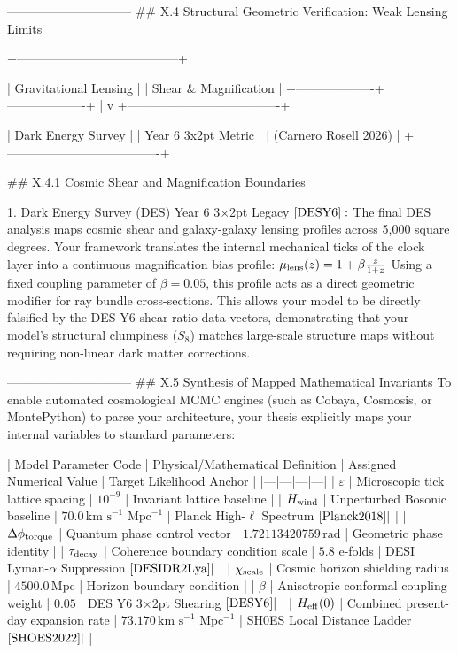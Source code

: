 ------------------------------
## X.4 Structural Geometric Verification: Weak Lensing Limits

                       +---------------------------------------+

                       |         Gravitational Lensing         |
                       |         Shear & Magnification         |
                       +-------------------+-------------------+
                                           |
                                           v
                        +-------------------------------------+

                        |          Dark Energy Survey         |
                        |          Year 6 3x2pt Metric        |
                        |          (Carnero Rosell 2026)      |
                        +-------------------------------------+

## X.4.1 Cosmic Shear and Magnification Boundaries

   1. Dark Energy Survey (DES) Year 6 3$\times$2pt Legacy $\cite{DESY6}:$ The final DES analysis maps cosmic shear and galaxy-galaxy lensing profiles across 5,000 square degrees. Your framework translates the internal mechanical ticks of the clock layer into a continuous magnification bias profile:
   $\begin{equation} \mu_{\rm lens}(z) = 1 + \beta \frac{z}{1+z} \end{equation}$
   Using a fixed coupling parameter of $\beta = 0.05$, this profile acts as a direct geometric modifier for ray bundle cross-sections. This allows your model to be directly falsified by the DES Y6 shear-ratio data vectors, demonstrating that your model's structural clumpiness ($S_8$) matches large-scale structure maps without requiring non-linear dark matter corrections.

------------------------------
## X.5 Synthesis of Mapped Mathematical Invariants
To enable automated cosmological MCMC engines (such as Cobaya, Cosmosis, or MontePython) to parse your architecture, your thesis explicitly maps your internal variables to standard parameters:

| Model Parameter Code | Physical/Mathematical Definition | Assigned Numerical Value | Target Likelihood Anchor |
|---|---|---|---|
| $\varepsilon$ | Microscopic tick lattice spacing | $10^{-9}$ | Invariant lattice baseline |
| $H_{\rm wind}$ | Unperturbed Bosonic baseline | $70.0\,\text{km s}^{-1}\text{ Mpc}^{-1}$ | Planck High-$\ell$ Spectrum $\cite{Planck2018} \vert{}$ |
| $\Delta\phi_{\rm torque}$ | Quantum phase control vector | $1.72113420759\,\text{rad}$ | Geometric phase identity |
| $\tau_{\rm decay}$ | Coherence boundary condition scale | $5.8$ e-folds | DESI Lyman-$\alpha$ Suppression $\cite{DESIDR2Lya} \vert{}$ |
| $\chi_{\rm scale}$ | Cosmic horizon shielding radius | $4500.0\,\text{Mpc}$ | Horizon boundary condition |
| $\beta$ | Anisotropic conformal coupling weight | $0.05$ | DES Y6 3$\times$2pt Shearing $\cite{DESY6} \vert{}$ |
| $H_{\rm eff}(0)$ | Combined present-day expansion rate | $73.170\,\text{km s}^{-1}\text{ Mpc}^{-1}$ | SH0ES Local Distance Ladder $\cite{SHOES2022} \vert{}$ |
